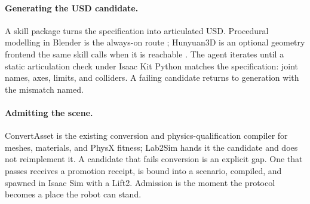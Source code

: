 \paragraph{Generating the USD candidate.}
A skill package turns the specification into articulated USD. Procedural
modelling in Blender is the always-on route \citep{blender2024}; Hunyuan3D is
an optional geometry frontend the same skill calls when it is reachable
\citep{zhao2025hunyuan3d}. The agent iterates until a static articulation
check under Isaac Kit Python matches the specification: joint names, axes,
limits, and colliders. A failing candidate returns to generation with the
mismatch named.

\paragraph{Admitting the scene.}
ConvertAsset is the existing conversion and physics-qualification compiler
for meshes, materials, and PhysX fitness; Lab2Sim hands it the candidate and
does not reimplement it. A candidate that fails conversion is an explicit
gap. One that passes receives a promotion receipt, is bound into a scenario,
compiled, and spawned in Isaac Sim with a Lift2. Admission is the moment the
protocol becomes a place the robot can stand.
